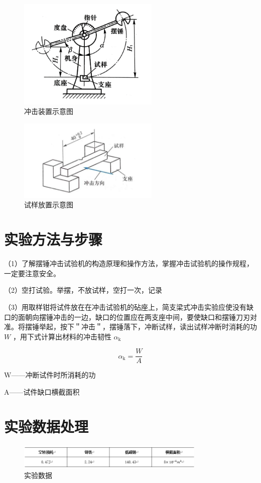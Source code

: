 \documentclass{article}
\begin{document}
\begin{figure}[H]
    \centering
    \includegraphics[width=0.6\textwidth]{img2.png}
    \caption{冲击装置示意图}
    \label{fig:diff_circuit}
\end{figure}
\begin{figure}[H]
    \centering
    \includegraphics[width=0.6\textwidth]{img3.png}
    \caption{试样放置示意图}
    \label{fig:diff_circuit}
\end{figure}

\section{实验方法与步骤}

（1）了解摆锤冲击试验机的构造原理和操作方法，掌握冲击试验机的操作规程，一定要注意安全。

（2）空打试验。举摆，不放试样，空打一次，记录

（3）用取样钳将试件放在在冲击试验机的砧座上，简支梁式冲击实验应使没有缺口的面朝向摆锤冲击的一边，缺口的位置应在两支座中间，要使缺口和摆锤刀刃对准。将摆锤举起，按下＂冲击＂，摆锤落下，冲断试样，读出试样冲断时消耗的功 $W$ ，用下式计算出材料的冲击韧性 $\alpha_{\mathrm{k}}$

$$
\alpha_{\mathrm{k}}=\frac{W}{A}
$$


W——冲断试件时所消耗的功 

A——试件缺口横截面积 

\section{实验数据处理}
\begin{figure}[H]
    \centering
    \includegraphics[width=0.8\textwidth]{img4.png}
    \caption{实验数据}
    \label{fig:diff_circuit}
\end{figure}
\end{document}
